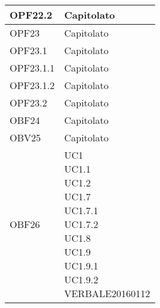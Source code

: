 \documentclass{scalatekids-article}
\begin{document}
\begin{longtable}[H]{|p{5.5cm}|p{5.5cm}|}
  \hline
  OPF22.2 & \multiLineCell[t]{Capitolato\\}\\
  \hline
  OPF23 & \multiLineCell[t]{Capitolato\\}\\
  \hline
  OPF23.1 & \multiLineCell[t]{Capitolato\\}\\
  \hline
  OPF23.1.1 & \multiLineCell[t]{Capitolato\\}\\
  \hline
  OPF23.1.2 & \multiLineCell[t]{Capitolato\\}\\
  \hline
  OPF23.2 & \multiLineCell[t]{Capitolato\\}\\
  \hline
  OBF24 & \multiLineCell[t]{Capitolato\\}\\
  \hline
  OBV25 & \multiLineCell[t]{Capitolato\\}\\
  \hline
  OBF26 & \multiLineCell[t]{UC1\\UC1.1\\UC1.2\\UC1.7\\UC1.7.1\\UC1.7.2\\UC1.8\\UC1.9\\UC1.9.1\\UC1.9.2\\VERBALE20160112\\}\\
  \hline
\end{longtable}
\newpage
\end{document}
